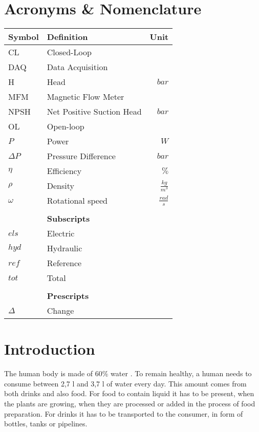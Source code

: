 \chapter*{Acronyms \& Nomenclature}
\begin{tabular*}{\textwidth}{@{\extracolsep{\fill}} l l r}
	\textbf{Symbol}	& \textbf{Definition}			& \textbf{Unit}\\
	\hline
	CL			& Closed-Loop						& \\
	DAQ 		& Data Acquisition		 			& \\
	H			& Head								& $bar$\\
	MFM 		& Magnetic Flow Meter 				& \\
	NPSH		& Net Positive Suction Head 		& $bar$\\
	OL			& Open-loop							& \\
	$P$			& Power								& $W$\\

	$\Delta P$	& Pressure Difference				& $bar$\\
	$\eta$		& Efficiency						& $\%$\\
	$\rho$		& Density							& $\frac{kg}{m^3}$\\
	$\omega$	& Rotational speed					& $\frac{rad}{s}$\\
	\hline \hline
				& 									&	\\
				& \textbf{Subscripts}				&	\\
	\hline
	$els$		& Electric							&	\\
	$hyd$		& Hydraulic							&	\\
	$ref$		& Reference							&	\\
	$tot$		& Total								&	\\
	\hline \hline
				& 									&	\\
				& \textbf{Prescripts}				&	\\
	\hline
	$\Delta$	& Change							&	\\
	\hline \hline
\end{tabular*}


\chapter{Introduction}\label{ch:introduction}
The human body is made of 60\% water \cite{HumanWater}.
To remain healthy,
a human needs to consume between 2,7 l and 3,7 l of water every day. \cite{DailyWater}
This amount comes from both drinks and also food.
For food to contain liquid it has to be present,
when the plants are growing,
when they are processed or added in the process of food preparation.
For drinks it has to be transported to the consumer,
in form of bottles, tanks or pipelines.

